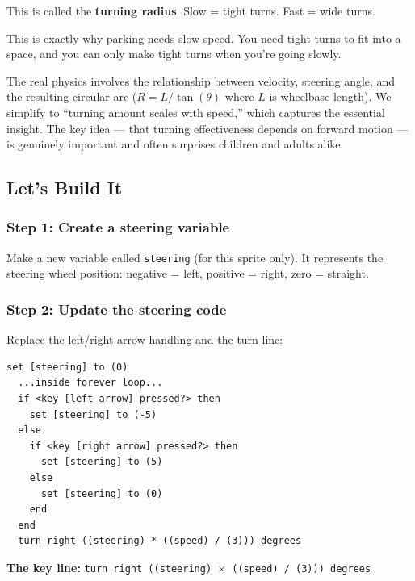 \documentclass[11pt,a4paper]{article}
\begin{document}
This is called the \textbf{turning radius}. Slow = tight turns. Fast = wide turns.

This is exactly why parking needs slow speed. You need tight turns to fit into a space, and you can only make tight turns when you're going slowly.

\begin{parentbox}
The real physics involves the relationship between velocity, steering angle, and the resulting circular arc ($R = L / \tan(\theta)$ where $L$ is wheelbase length). We simplify to ``turning amount scales with speed,'' which captures the essential insight. The key idea --- that turning effectiveness depends on forward motion --- is genuinely important and often surprises children and adults alike.
\end{parentbox}

\subsection{Let's Build It}

\subsubsection{Step 1: Create a steering variable}

Make a new variable called \texttt{steering} (for this sprite only). It represents the steering wheel position: negative = left, positive = right, zero = straight.

\subsubsection{Step 2: Update the steering code}

Replace the left/right arrow handling and the turn line:

\begin{scratchblockbox}
\begin{lstlisting}[style=scratch]
set [steering] to (0)
  ...inside forever loop...
  if <key [left arrow] pressed?> then
    set [steering] to (-5)
  else
    if <key [right arrow] pressed?> then
      set [steering] to (5)
    else
      set [steering] to (0)
    end
  end
  turn right ((steering) * ((speed) / (3))) degrees
\end{lstlisting}
\end{scratchblockbox}

\textbf{The key line:} \texttt{turn right ((steering) $\times$ ((speed) / (3))) degrees}
\end{document}
